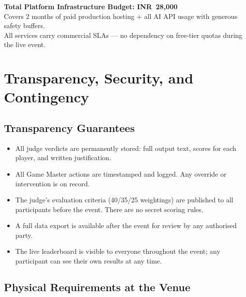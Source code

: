 \documentclass[11pt, a4paper]{article}
\begin{document}
\begin{tcolorbox}[highlightbox]
\centering
{\normalsize\bfseries\textcolor{primaryblue}{Total Platform Infrastructure Budget: INR~28,000}}\\[0.12cm]
{\small Covers 2 months of paid production hosting + all AI API usage with generous safety buffers.}\\[0.08cm]
{\small All services carry commercial SLAs --- no dependency on free-tier quotas during the live event.}
\end{tcolorbox}

\section{Transparency, Security, and Contingency}

\subsection{Transparency Guarantees}

\begin{itemize}[leftmargin=1.2cm, itemsep=2pt]
    \item All judge verdicts are permanently stored: full output text, scores for each player, and written justification.
    \item All Game Master actions are timestamped and logged. Any override or intervention is on record.
    \item The judge's evaluation criteria (40/35/25 weightings) are published to all participants before the event. There are no secret scoring rules.
    \item A full data export is available after the event for review by any authorised party.
    \item The live leaderboard is visible to everyone throughout the event; any participant can see their own results at any time.
\end{itemize}

\subsection{Physical Requirements at the Venue}
\end{document}

